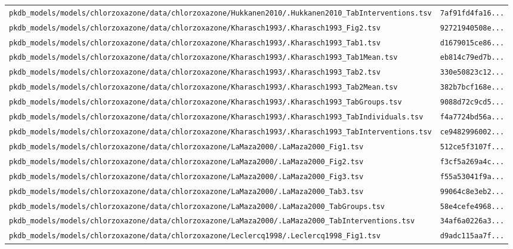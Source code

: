 \begin{longtable}{ll}
\texttt{pkdb\_models/models/chlorzoxazone/data/chlorzoxazone/Hukkanen2010/.Hukkanen2010\_TabInterventions.tsv} & \texttt{7af91fd4fa16...} \\
\texttt{pkdb\_models/models/chlorzoxazone/data/chlorzoxazone/Kharasch1993/.Kharasch1993\_Fig2.tsv} & \texttt{92721940508e...} \\
\texttt{pkdb\_models/models/chlorzoxazone/data/chlorzoxazone/Kharasch1993/.Kharasch1993\_Tab1.tsv} & \texttt{d1679015ce86...} \\
\texttt{pkdb\_models/models/chlorzoxazone/data/chlorzoxazone/Kharasch1993/.Kharasch1993\_Tab1Mean.tsv} & \texttt{eb814c79ed7b...} \\
\texttt{pkdb\_models/models/chlorzoxazone/data/chlorzoxazone/Kharasch1993/.Kharasch1993\_Tab2.tsv} & \texttt{330e50823c12...} \\
\texttt{pkdb\_models/models/chlorzoxazone/data/chlorzoxazone/Kharasch1993/.Kharasch1993\_Tab2Mean.tsv} & \texttt{382b7bcf168e...} \\
\texttt{pkdb\_models/models/chlorzoxazone/data/chlorzoxazone/Kharasch1993/.Kharasch1993\_TabGroups.tsv} & \texttt{9088d72c9cd5...} \\
\texttt{pkdb\_models/models/chlorzoxazone/data/chlorzoxazone/Kharasch1993/.Kharasch1993\_TabIndividuals.tsv} & \texttt{f4a7724bd56a...} \\
\texttt{pkdb\_models/models/chlorzoxazone/data/chlorzoxazone/Kharasch1993/.Kharasch1993\_TabInterventions.tsv} & \texttt{ce9482996002...} \\
\texttt{pkdb\_models/models/chlorzoxazone/data/chlorzoxazone/LaMaza2000/.LaMaza2000\_Fig1.tsv} & \texttt{512ce5f3107f...} \\
\texttt{pkdb\_models/models/chlorzoxazone/data/chlorzoxazone/LaMaza2000/.LaMaza2000\_Fig2.tsv} & \texttt{f3cf5a269a4c...} \\
\texttt{pkdb\_models/models/chlorzoxazone/data/chlorzoxazone/LaMaza2000/.LaMaza2000\_Fig3.tsv} & \texttt{f55a53041f9a...} \\
\texttt{pkdb\_models/models/chlorzoxazone/data/chlorzoxazone/LaMaza2000/.LaMaza2000\_Tab3.tsv} & \texttt{99064c8e3eb2...} \\
\texttt{pkdb\_models/models/chlorzoxazone/data/chlorzoxazone/LaMaza2000/.LaMaza2000\_TabGroups.tsv} & \texttt{58e4cefe4968...} \\
\texttt{pkdb\_models/models/chlorzoxazone/data/chlorzoxazone/LaMaza2000/.LaMaza2000\_TabInterventions.tsv} & \texttt{34af6a0226a3...} \\
\texttt{pkdb\_models/models/chlorzoxazone/data/chlorzoxazone/Leclercq1998/.Leclercq1998\_Fig1.tsv} & \texttt{d9adc115aa7f...} \\

\end{longtable}

